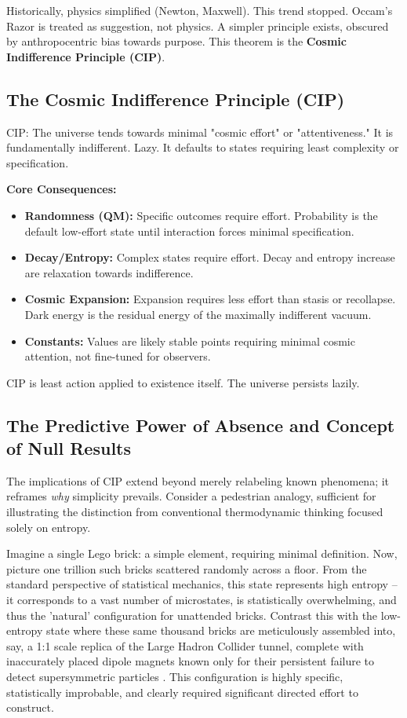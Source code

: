 \documentclass[11pt, a4paper]{article}
\begin{document}
Historically, physics simplified (Newton, Maxwell). This trend stopped. Occam's Razor \cite{Occam1347} is treated as suggestion, not physics. A simpler principle exists, obscured by anthropocentric bias towards purpose. This theorem is the \textbf{Cosmic Indifference Principle (CIP)}.

\subsection{The Cosmic Indifference Principle (CIP)}

CIP: The universe tends towards minimal "cosmic effort" or "attentiveness." It is fundamentally indifferent. Lazy. It defaults to states requiring least complexity or specification.

\textbf{Core Consequences:}
\begin{itemize}
    \item \textbf{Randomness (QM):} Specific outcomes require effort. Probability is the default low-effort state until interaction forces minimal specification.
    \item \textbf{Decay/Entropy:} Complex states require effort. Decay and entropy increase are relaxation towards indifference.
    \item \textbf{Cosmic Expansion:} Expansion requires less effort than stasis or recollapse. Dark energy is the residual energy of the maximally indifferent vacuum.
    \item \textbf{Constants:} Values are likely stable points requiring minimal cosmic attention, not fine-tuned for observers.
\end{itemize}

CIP is least action \cite{FeynmanPathIntegral} applied to existence itself. The universe persists lazily.

\subsection{The Predictive Power of Absence and Concept of Null Results}

The implications of CIP extend beyond merely relabeling known phenomena; it reframes \textit{why} simplicity prevails. Consider a pedestrian analogy, sufficient for illustrating the distinction from conventional thermodynamic thinking focused solely on entropy.

Imagine a single Lego brick: a simple element, requiring minimal definition. Now, picture one trillion such bricks scattered randomly across a floor. From the standard perspective of statistical mechanics, this state represents high entropy – it corresponds to a vast number of microstates, is statistically overwhelming, and thus the 'natural' configuration for unattended bricks. Contrast this with the low-entropy state where these same thousand bricks are meticulously assembled into, say, a 1:1 scale replica of the Large Hadron Collider tunnel, complete with inaccurately placed dipole magnets known only for their persistent failure to detect supersymmetric particles \cite{SupersymmetrySearches}. This configuration is highly specific, statistically improbable, and clearly required significant directed effort to construct.
\end{document}
